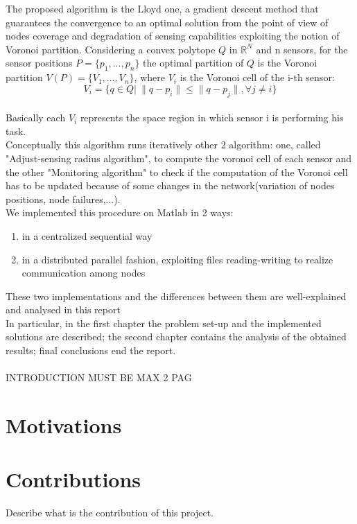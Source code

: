 \documentclass[a4paper,11pt,oneside]{book}
\begin{document}
The proposed algorithm is the Lloyd one, a gradient descent method that guarantees the convergence to an optimal solution from the point of view of nodes coverage and degradation of sensing capabilities exploiting the notion of Voronoi partition. Considering a convex polytope $Q$ in $\mathbb{R}^N$ and n sensors, for the sensor positions $P=\{p_1,...,p_n\}$ the optimal partition of $Q$ is the Voronoi partition  $V(P)=\{V_1,...,V_n\}$, where $V_i$ is the Voronoi cell of the i-th sensor: $$V_i=\{q\in Q|\> \|q-p_i\|\le\|q-p_j\|, \forall j\not= i\}$$\\
Basically each $V_i$ represents the space region in which sensor i is performing his task.\\
Conceptually this algorithm runs iteratively other 2 algorithm: one, called "Adjust-sensing radius algorithm", to compute the voronoi cell of each sensor and the other "Monitoring algorithm" to check if the computation of the Voronoi cell has to be updated because of some changes in the network(variation of nodes positions, node failures,...).\\
We implemented this procedure on Matlab in 2 ways:
\begin{enumerate}
	\item in a centralized sequential way
	\item in a distributed parallel fashion, exploiting files reading-writing to realize communication among nodes
\end{enumerate}
These two implementations and the differences between them are well-explained and analysed in this report\\
In particular, in the first chapter the problem set-up and the implemented solutions are described; the second chapter contains the analysis of the obtained results; final conclusions end the report.\\
\\
INTRODUCTION MUST BE MAX 2 PAG


 


 
\section*{Motivations}
\section*{Contributions}
Describe what is the contribution of this project.

\end{document}
